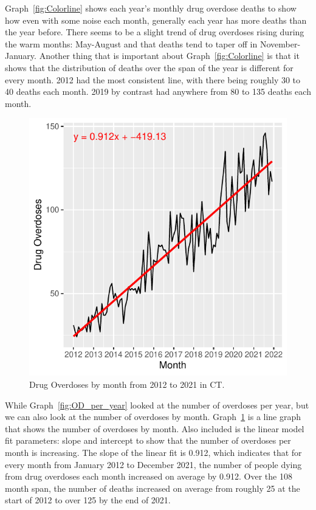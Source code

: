 \documentclass[12pt, letterpaper, titlepage]{article}
\begin{document}
Graph~\ref{fig:Colorline} shows each year's monthly drug overdose deaths to show how even with some noise each month, generally each year has more deaths than the year before.  There seems to be a slight trend of drug overdoses rising during the warm months: May-August and that deaths tend to taper off in November-January.
Another thing that is important about Graph~\ref{fig:Colorline} is that it shows that the distribution of deaths over the span of the year is different for every month.  2012 had the most consistent line, with there being roughly 30 to 40 deaths each month.  2019 by contrast had anywhere from 80 to 135 deaths each month. 

\begin{figure}[tbp]
    \centering
    \includegraphics{Trendline}
    \caption{Drug Overdoses by month from 2012 to 2021 in CT.}
    \label{fig:Trendline}
  \end{figure}

While Graph~\ref{fig:OD_per_year} looked at the number of overdoses per year, but we can also look at the number of overdoses by month.  Graph~\ref{fig:Trendline} is a line graph that shows the number of overdoses by month.  Also included is the linear model fit parameters: slope and intercept to show that the number of overdoses per month is increasing.  The slope of the linear fit is 0.912, which indicates that for every month from January 2012 to December 2021, the number of people dying from drug overdoses each month increased on average by 0.912.  Over the 108 month span, the number of deaths increased on average from roughly 25 at the start of 2012 to over 125 by the end of 2021.
\end{document}
